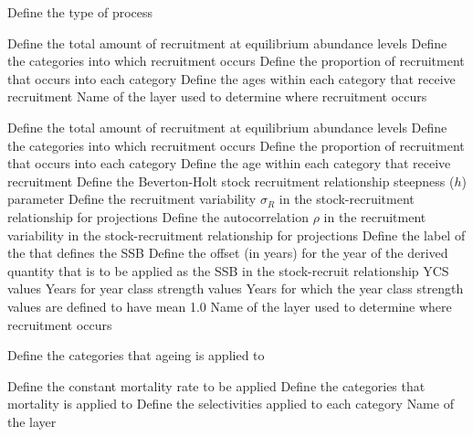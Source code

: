  {Define the type of process}
\par\textbf{}\par
{} {Define the total amount of recruitment at equilibrium abundance levels}
 {Define the categories into which recruitment occurs}
 {Define the proportion of recruitment that occurs into each category}
 {Define the ages within each category that receive recruitment}
 {Name of the layer used to determine where recruitment occurs}
\par\textbf{}\par
{} {Define the total amount of recruitment at equilibrium abundance levels}
 {Define the categories into which recruitment occurs}
 {Define the proportion of recruitment that occurs into each category}
 {Define the age within each category that receive recruitment}
 {Define the Beverton-Holt stock recruitment relationship steepness ($h$) parameter}
 {Define the recruitment variability $\sigma_R$ in the stock-recruitment relationship for projections}
 {Define the autocorrelation $\rho$ in the recruitment variability in the stock-recruitment relationship for projections}
 {Define the label of the  that defines the SSB}
 {Define the offset (in years) for the year of the derived quantity that is to be applied as the SSB in the stock-recruit relationship}
 {YCS values}
 {Years for year class strength values}
 {Years for which the year class strength values are defined to have mean 1.0}
 {Name of the layer used to determine where recruitment occurs}
\par\textbf{}\par
{} {Define the categories that ageing is applied to}
\par\textbf{}\par
{} {Define the constant mortality rate to be applied}
 {Define the categories that mortality is applied to}
 {Define the selectivities applied to each category}
 {Name of the layer}
\par\textbf{}\par
